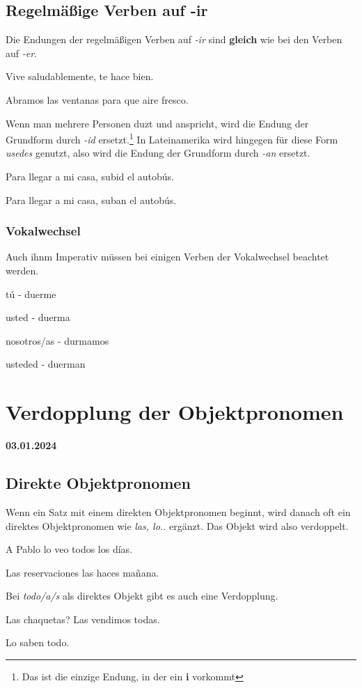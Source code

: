 \subsection*{Regelmäßige Verben auf -ir}
Die Endungen der regelmäßigen Verben auf \textit{-ir} sind
\textbf{gleich} wie bei den Verben auf \textit{-er}.
\begin{ejemplos}
    \item Vive saludablemente, te hace bien.
    \item Abramos las ventanas para que aire fresco.
\end{ejemplos}
Wenn man mehrere Personen duzt und anspricht, wird die 
Endung der Grundform durch \textit{-id} 
ersetzt.\footnote[1]{Das ist die einzige Endung, 
in der ein \textbf{i} vorkommt} In Lateinamerika wird 
hingegen für diese Form \textit{usedes} genutzt, 
also wird die Endung der Grundform durch \textit{-an} ersetzt.
\begin{ejemplos}
    \item Para llegar a mi casa, subid el autob\'us.
    \item Para llegar a mi casa, suban el autob\'us.
\end{ejemplos}
\subsubsection*{Vokalwechsel}
Auch ihnm Imperativ müssen bei einigen Verben der Vokalwechsel 
beachtet werden.
\begin{ejemplos}
    \item t\'u - duerme
    \item usted - duerma
    \item nosotros/as - durmamos
    \item usteded - duerman
\end{ejemplos}
\section{Verdopplung der Objektpronomen}
\textbf{03.01.2024}\\
\subsection*{Direkte Objektpronomen}
Wenn ein Satz mit einem direkten Objektpronomen beginnt,
wird danach oft ein direktes Objektpronomen wie \textit{las, lo..}
ergänzt. Das Objekt wird also verdoppelt.
\begin{ejemplos}
    \item A Pablo lo veo todos los d\'ias.
    \item Las reservaciones las haces ma\~nana.
\end{ejemplos}
Bei \textit{todo/a/s} als direktes Objekt gibt es auch eine
Verdopplung.
\begin{ejemplos}
    \item Las chaquetas? Las vendimos todas.
    \item Lo saben todo.
\end{ejemplos}
